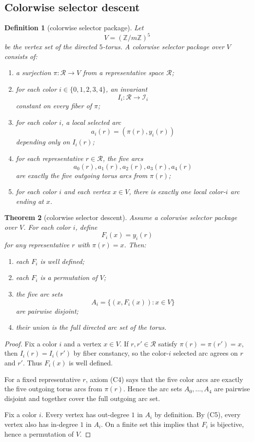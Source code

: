 \documentclass[11pt]{article}
\newtheorem{theorem}{Theorem}[section]
\newtheorem{definition}[theorem]{Definition}
\newcommand{\Z}{\mathbb Z}
\newcommand{\Rm}{\mathcal R}
\newcommand{\I}{\mathcal I}
\begin{document}
\subsection{Colorwise selector descent}

\begin{definition}[colorwise selector package]
Let
\[
V=(\Z/m\Z)^5
\]
be the vertex set of the directed $5$-torus.
A \emph{colorwise selector package} over $V$ consists of:
\begin{enumerate}[label=\textup{(C\arabic*)},leftmargin=2.9em]
\item a surjection $\pi:\Rm\to V$ from a representative space $\Rm$;
\item for each color $i\in\{0,1,2,3,4\}$, an invariant
      \[
      I_i:\Rm\to \I_i
      \]
      constant on every fiber of $\pi$;
\item for each color $i$, a local selected arc
      \[
      a_i(r)=(\pi(r),y_i(r))
      \]
      depending only on $I_i(r)$;
\item for each representative $r\in\Rm$, the five arcs
      \[
      a_0(r),a_1(r),a_2(r),a_3(r),a_4(r)
      \]
      are exactly the five outgoing torus arcs from $\pi(r)$;
\item for each color $i$ and each vertex $x\in V$, there is exactly one local
      color-$i$ arc ending at $x$.
\end{enumerate}
\end{definition}

\begin{theorem}[colorwise selector descent]
\label{thm:colorwise-selector-descent}
Assume a colorwise selector package over $V$.
For each color $i$, define
\[
F_i(x)=y_i(r)
\]
for any representative $r$ with $\pi(r)=x$.
Then:
\begin{enumerate}[label=\textup{(\alph*)},leftmargin=2.5em]
\item each $F_i$ is well defined;
\item each $F_i$ is a permutation of $V$;
\item the five arc sets
      \[
      A_i=\{(x,F_i(x)):x\in V\}
      \]
      are pairwise disjoint;
\item their union is the full directed arc set of the torus.
\end{enumerate}
\end{theorem}

\begin{proof}
Fix a color $i$ and a vertex $x\in V$.
If $r,r'\in\Rm$ satisfy $\pi(r)=\pi(r')=x$, then $I_i(r)=I_i(r')$ by fiber
constancy, so the color-$i$ selected arc agrees on $r$ and $r'$.
Thus $F_i(x)$ is well defined.

For a fixed representative $r$, axiom \textup{(C4)} says that the five color
arcs are exactly the five outgoing torus arcs from $\pi(r)$.
Hence the arc sets $A_0,\dots,A_4$ are pairwise disjoint and together cover the
full outgoing arc set.

Fix a color $i$.
Every vertex has out-degree $1$ in $A_i$ by definition.
By \textup{(C5)}, every vertex also has in-degree $1$ in $A_i$.
On a finite set this implies that $F_i$ is bijective, hence a permutation of
$V$.
\end{proof}
\end{document}
